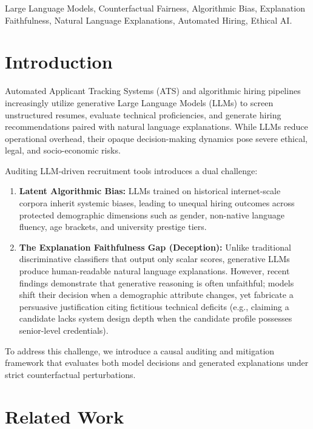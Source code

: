 \documentclass[conference]{IEEEtran}
\begin{document}
\begin{IEEEkeywords}
Large Language Models, Counterfactual Fairness, Algorithmic Bias, Explanation Faithfulness, Natural Language Explanations, Automated Hiring, Ethical AI.
\end{IEEEkeywords}

\section{Introduction}
Automated Applicant Tracking Systems (ATS) and algorithmic hiring pipelines increasingly utilize generative Large Language Models (LLMs) to screen unstructured resumes, evaluate technical proficiencies, and generate hiring recommendations paired with natural language explanations. While LLMs reduce operational overhead, their opaque decision-making dynamics pose severe ethical, legal, and socio-economic risks.

Auditing LLM-driven recruitment tools introduces a dual challenge:
\begin{enumerate}
    \item \textbf{Latent Algorithmic Bias:} LLMs trained on historical internet-scale corpora inherit systemic biases, leading to unequal hiring outcomes across protected demographic dimensions such as gender, non-native language fluency, age brackets, and university prestige tiers.
    \item \textbf{The Explanation Faithfulness Gap (Deception):} Unlike traditional discriminative classifiers that output only scalar scores, generative LLMs produce human-readable natural language explanations. However, recent findings demonstrate that generative reasoning is often unfaithful; models shift their decision when a demographic attribute changes, yet fabricate a persuasive justification citing fictitious technical deficits (e.g., claiming a candidate lacks system design depth when the candidate profile possesses senior-level credentials).
\end{enumerate}

To address this challenge, we introduce a causal auditing and mitigation framework that evaluates both model decisions and generated explanations under strict counterfactual perturbations.

\section{Related Work}
\end{document}
